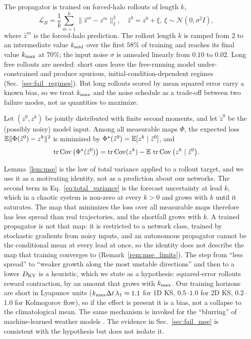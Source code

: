 The propagator is trained on forced-halo rollouts of length $k$,
\begin{equation}
  \mathcal{L}_B = \frac1k\sum_{m=1}^{k}
  \big\|\hat z^{m} - z^{m}\big\|_{I}^{2},
  \quad \hat z^{0} = z^{0} + \xi,\ \xi\sim\mathcal N(0,\sigma^2 I),
  \label{eq:stageB}
\end{equation}
where $\hat z^{m}$ is the forced-halo prediction. The rollout length $k$
is ramped from $2$ to an intermediate value $k_{\mathrm{mid}}$ over the first $58\%$
of training and reaches its final value $k_{\max}$ at $70\%$; the input
noise $\sigma$ is
annealed linearly from $0.10$ to $0.02$. Long free rollouts are needed:
short ones leave the free-running model under-constrained and produce
spurious, initial-condition-dependent regimes (Sec.~\ref{sec:fail_regimes}).
But long rollouts scored by mean squared error carry a known bias, so we
treat $k_{\max}$ and the noise schedule as a trade-off between two failure
modes, not as quantities to maximize.

\begin{lemma}
\label{lem:mse}
Let $(z^0, z^k)$ be jointly distributed with finite second moments, and
let $\tilde z^0$ be the (possibly noisy) model input. Among all
measurable maps $\Phi$, the expected loss
$\mathbb{E}\|\Phi(\tilde z^0)-z^k\|^2$ is minimized by
$\Phi^\star(\tilde z^0)=\mathbb{E}[z^k\mid\tilde z^0]$, and
\begin{equation}
  \operatorname{tr}\operatorname{Cov}\big(\Phi^\star(\tilde z^0)\big)
  = \operatorname{tr}\operatorname{Cov}(z^k) - \mathbb{E}\,\operatorname{tr}\operatorname{Cov}\big(z^k\mid\tilde z^0\big).
  \label{eq:total_variance}
\end{equation}
\end{lemma}

Lemma~\ref{lem:mse} is the law of total variance applied to a rollout
target, and we use it as a motivating identity, not as a prediction about
our networks. The second term in Eq.~\eqref{eq:total_variance} is the
forecast uncertainty at lead $k$, which in a chaotic system is non-zero at
every $k>0$ and grows with $k$ until it saturates. The map that minimizes
the loss over all measurable maps therefore has less spread than real
trajectories, and the shortfall grows with $k$. A trained propagator is
not that map: it is restricted to a network class, trained by stochastic
gradients from noisy inputs, and an autonomous propagator cannot be the
conditional mean at every lead at once, so the identity does not describe
the map that training converges to (Remark~\ref{rem:mse_limits}). The step from ``less spread'' to ``weaker growth along the most
unstable directions'' and then to a lower $D_{\mathrm{KY}}$ is a heuristic, which
we state as a hypothesis: squared-error rollouts reward contraction, by
an amount that grows with $k_{\max}$. Our training horizons are short in
Lyapunov units ($k_{\max}\Delta t\,\lambda_1\approx1.1$ for 1D KS,
$0.5$--$1.0$ for 2D KS, $0.2$--$1.0$ for Kolmogorov flow), so if the
effect is present it is a bias, not a collapse to the climatological
mean. The same mechanism is invoked for the ``blurring'' of
machine-learned weather models \citep{lam2023graphcast,bonavita2024}. The
evidence in Sec.~\ref{sec:fail_mse} is consistent with the hypothesis but
does not isolate it.

